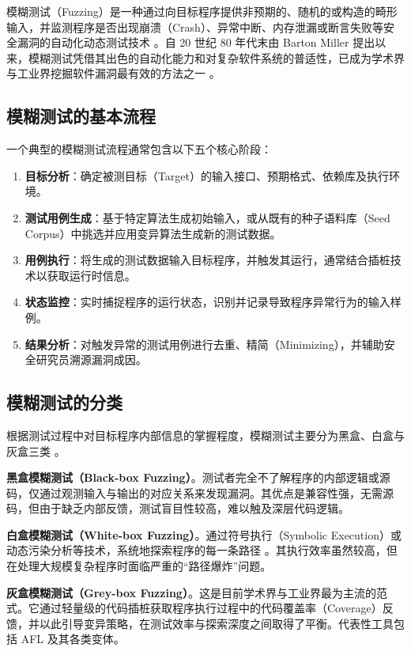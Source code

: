模糊测试（Fuzzing）是一种通过向目标程序提供非预期的、随机的或构造的畸形输入，并监测程序是否出现崩溃（Crash）、异常中断、内存泄漏或断言失败等安全漏洞的自动化动态测试技术 \cite{miller1990empirical}。自 20 世纪 80 年代末由 Barton Miller 提出以来，模糊测试凭借其出色的自动化能力和对复杂软件系统的普适性，已成为学术界与工业界挖掘软件漏洞最有效的方法之一 \cite{manes2019art}。

\subsection{模糊测试的基本流程}

一个典型的模糊测试流程通常包含以下五个核心阶段：
\begin{enumerate}[label=\arabic*)]
    \item \textbf{目标分析}：确定被测目标（Target）的输入接口、预期格式、依赖库及执行环境。
    \item \textbf{测试用例生成}：基于特定算法生成初始输入，或从既有的种子语料库（Seed Corpus）中挑选并应用变异算法生成新的测试数据。
    \item \textbf{用例执行}：将生成的测试数据输入目标程序，并触发其运行，通常结合插桩技术以获取运行时信息。
    \item \textbf{状态监控}：实时捕捉程序的运行状态，识别并记录导致程序异常行为的输入样例。
    \item \textbf{结果分析}：对触发异常的测试用例进行去重、精简（Minimizing），并辅助安全研究员溯源漏洞成因。
\end{enumerate}

\subsection{模糊测试的分类}

根据测试过程中对目标程序内部信息的掌握程度，模糊测试主要分为黑盒、白盒与灰盒三类 \cite{liang2018fuzzing}。

\textbf{黑盒模糊测试（Black-box Fuzzing）}。测试者完全不了解程序的内部逻辑或源码，仅通过观测输入与输出的对应关系来发现漏洞。其优点是兼容性强，无需源码，但由于缺乏内部反馈，测试盲目性较高，难以触及深层代码逻辑。

\textbf{白盒模糊测试（White-box Fuzzing）}。通过符号执行（Symbolic Execution）或动态污染分析等技术，系统地探索程序的每一条路径 \cite{godefroid2008automated}。其执行效率虽然较高，但在处理大规模复杂程序时面临严重的“路径爆炸”问题。

\textbf{灰盒模糊测试（Grey-box Fuzzing）}。这是目前学术界与工业界最为主流的范式。它通过轻量级的代码插桩获取程序执行过程中的代码覆盖率（Coverage）反馈，并以此引导变异策略，在测试效率与探索深度之间取得了平衡。代表性工具包括 AFL \cite{zalewski2014american} 及其各类变体。

